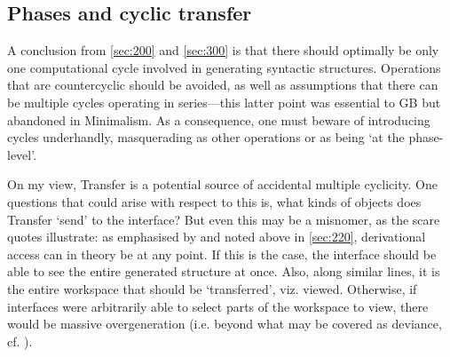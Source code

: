 \subsection{Phases and cyclic transfer}\label{sec:440}

A conclusion from \autoref{sec:200} and \autoref{sec:300} is that there should optimally be only one computational cycle involved in generating syntactic structures. Operations that are countercyclic should be avoided, as well as assumptions that there can be multiple cycles operating in series---this latter point was essential to GB but abandoned in Minimalism. As a consequence, one must beware of introducing cycles underhandly, masquerading as other operations or as being `at the phase-level'.

On my view, Transfer is a potential source of accidental multiple cyclicity. One questions that could arise with respect to this is, what kinds of objects does Transfer `send' to the interface? But even this may be a misnomer, as the scare quotes illustrate: as emphasised by \textcite{ChomskyN_2021} and noted above in \autoref{sec:220}, derivational access can in theory be at any point. If this is the case, the interface should be able to see the entire generated structure at once. Also, along similar lines, it is the entire workspace that should be `transferred', viz. viewed. Otherwise, if interfaces were arbitrarily able to select parts of the workspace to view, there would be massive overgeneration (i.e. beyond what may be covered as deviance, cf. ).

